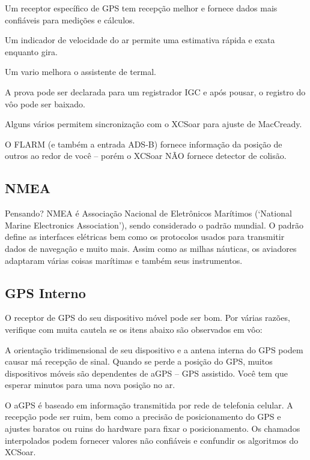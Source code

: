 \documentclass[a4paper,12pt]{refrep}
\begin{document}
\begin{compactitem}
\item Um receptor específico de GPS tem recepção melhor e fornece dados mais confiáveis para medições e cálculos.
\item Um indicador de velocidade do ar permite uma estimativa rápida e exata enquanto gira.
\item Um vario melhora o assistente de termal.
\item A prova pode ser declarada para um registrador IGC e após pousar, o registro do vôo pode ser baixado.
\item Alguns vários permitem sincronização com o XCSoar para ajuste de MacCready.
\item O FLARM (e também a entrada ADS-B) fornece informação da posição de outros ao redor de você – porém o XCSoar NÃO fornece detector de colisão.
\end{compactitem}

\subsection{\textcolor{flashblue}{NMEA}}
Pensando? NMEA é Associação Nacional de Eletrônicos Marítimos (‘National Marine Electronics Association’), sendo considerado o padrão mundial.  O padrão define as interfaces elétricas bem como os protocolos usados para transmitir dados de navegação e muito mais.  Assim como as milhas náuticas, os aviadores adaptaram várias coisas marítimas e também seus instrumentos.

\subsection{\textcolor{flashblue}{GPS Interno}}
O receptor de GPS do seu dispositivo móvel pode ser bom.  Por várias razões, verifique com muita cautela se os itens abaixo são observados em vôo:

\begin{compactitem}
\item A orientação tridimensional de seu dispositivo e a antena interna do GPS podem causar má recepção de sinal.  Quando se perde a posição do GPS, muitos dispositivos móveis são dependentes de aGPS – GPS assistido.  Você tem que esperar minutos para uma nova posição no ar.  
\item O aGPS é baseado em informação transmitida por rede de telefonia celular.  A recepção pode ser ruim, bem como a precisão de posicionamento do GPS e ajustes baratos ou ruins do hardware para fixar o posicionamento.  Os chamados interpolados podem fornecer valores não confiáveis e confundir os algoritmos do XCSoar.

\end{compactitem}
\end{document}
